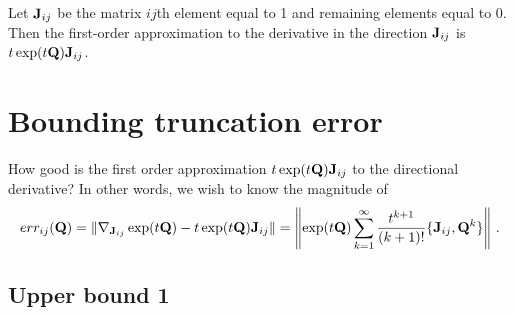 \documentclass[12pt]{article} %
\begin{document}
%

\noindent
Let $\mathbf{J}_{ij}$ be the matrix $ij$th element equal to 1 and remaining elements equal to 0.  Then the first-order approximation to the derivative in the direction $\mathbf{J}_{ij}$ is $t \exp(t\mathbf{Q})\mathbf{J}_{ij}$.

\section{Bounding truncation error}

How good is the first order approximation $t \exp(t\mathbf{Q})\mathbf{J}_{ij}$ to the directional derivative?  In other words, we wish to know the magnitude of
\begin{align*}
err_{ij}(\mathbf{Q}) =	\Vert\nabla_{\mathbf{J}_{ij}} \exp(t\mathbf{Q}) - t \exp(t\mathbf{Q})\mathbf{J}_{ij} \Vert = \left\Vert \exp(t\mathbf{Q})  \sum_{k=1}^\infty \frac{t^{k+1}}{(k+1)!} \{\mathbf{J}_{ij},\mathbf{Q}^k\} \right\Vert \, .
\end{align*}

\subsection{Upper bound 1}
\end{document}
